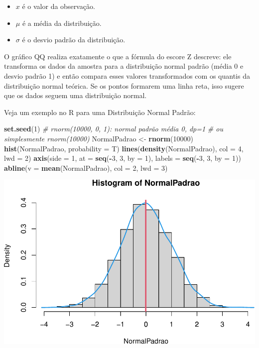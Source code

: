 \documentclass[
]{book}
\newenvironment{Shaded}{\begin{snugshade}}{\end{snugshade}}
\newcommand{\AttributeTok}[1]{\textcolor[rgb]{0.13,0.29,0.53}{#1}}
\newcommand{\CommentTok}[1]{\textcolor[rgb]{0.56,0.35,0.01}{\textit{#1}}}
\newcommand{\DecValTok}[1]{\textcolor[rgb]{0.00,0.00,0.81}{#1}}
\newcommand{\FunctionTok}[1]{\textcolor[rgb]{0.13,0.29,0.53}{\textbf{#1}}}
\newcommand{\NormalTok}[1]{#1}
\newcommand{\OtherTok}[1]{\textcolor[rgb]{0.56,0.35,0.01}{#1}}
\newcommand{\SpecialCharTok}[1]{\textcolor[rgb]{0.81,0.36,0.00}{\textbf{#1}}}
\providecommand{\tightlist}{%
  \setlength{\itemsep}{0pt}\setlength{\parskip}{0pt}}
\begin{document}
\begin{itemize}
\tightlist
\item
  \(x\) é o valor da observação.
\item
  \(\mu\) é a média da distribuição.
\item
  \(\sigma\) é o desvio padrão da distribuição.
\end{itemize}

O gráfico QQ realiza exatamente o que a fórmula do escore Z descreve: ele transforma os dados da amostra para a distribuição normal padrão (média 0 e desvio padrão 1) e então compara esses valores transformados com os quantis da distribuição normal teórica. Se os pontos formarem uma linha reta, isso sugere que os dados seguem uma distribuição normal.

Veja um exemplo no R para uma Distribuição Normal Padrão:

\begin{Shaded}
\begin{Highlighting}[]
\FunctionTok{set.seed}\NormalTok{(}\DecValTok{1}\NormalTok{)}
\CommentTok{\# rnorm(10000, 0, 1): normal padrão média 0, dp=1}
\CommentTok{\# ou simplesmente rnorm(10000)}
\NormalTok{NormalPadrao }\OtherTok{\textless{}{-}} \FunctionTok{rnorm}\NormalTok{(}\DecValTok{10000}\NormalTok{)}
\FunctionTok{hist}\NormalTok{(NormalPadrao, }\AttributeTok{probability =}\NormalTok{ T)}
\FunctionTok{lines}\NormalTok{(}\FunctionTok{density}\NormalTok{(NormalPadrao), }\AttributeTok{col =} \DecValTok{4}\NormalTok{, }\AttributeTok{lwd =} \DecValTok{2}\NormalTok{)}
\FunctionTok{axis}\NormalTok{(}\AttributeTok{side =} \DecValTok{1}\NormalTok{, }\AttributeTok{at =} \FunctionTok{seq}\NormalTok{(}\SpecialCharTok{{-}}\DecValTok{3}\NormalTok{, }\DecValTok{3}\NormalTok{, }\AttributeTok{by =} \DecValTok{1}\NormalTok{), }\AttributeTok{labels =} \FunctionTok{seq}\NormalTok{(}\SpecialCharTok{{-}}\DecValTok{3}\NormalTok{, }\DecValTok{3}\NormalTok{, }\AttributeTok{by =} \DecValTok{1}\NormalTok{))}
\FunctionTok{abline}\NormalTok{(}\AttributeTok{v =} \FunctionTok{mean}\NormalTok{(NormalPadrao), }\AttributeTok{col =} \DecValTok{2}\NormalTok{, }\AttributeTok{lwd =} \DecValTok{3}\NormalTok{)}
\end{Highlighting}
\end{Shaded}

\includegraphics{Livro-Estatistica+R_files/figure-latex/unnamed-chunk-32-1.pdf}
\end{document}
